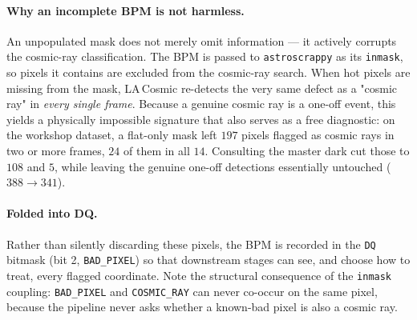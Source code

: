 \documentclass[11pt,a4paper]{article}
\begin{document}
\paragraph{Why an incomplete BPM is not harmless.} An unpopulated mask does not merely omit information --- it actively corrupts the cosmic-ray classification. The BPM is passed to \texttt{astroscrappy} as its \texttt{inmask}, so pixels it contains are excluded from the cosmic-ray search. When hot pixels are missing from the mask, LA\,Cosmic re-detects the very same defect as a "cosmic ray" in \emph{every single frame}. Because a genuine cosmic ray is a one-off event, this yields a physically impossible signature that also serves as a free diagnostic: on the workshop dataset, a flat-only mask left $197$ pixels flagged as cosmic rays in two or more frames, $24$ of them in all $14$. Consulting the master dark cut those to $108$ and $5$, while leaving the genuine one-off detections essentially untouched ($388 \rightarrow 341$).

\paragraph{Folded into DQ.} Rather than silently discarding these pixels, the BPM is recorded in the \texttt{DQ} bitmask (bit 2, \texttt{BAD\_PIXEL}) so that downstream stages can see, and choose how to treat, every flagged coordinate. Note the structural consequence of the \texttt{inmask} coupling: \texttt{BAD\_PIXEL} and \texttt{COSMIC\_RAY} can never co-occur on the same pixel, because the pipeline never asks whether a known-bad pixel is also a cosmic ray.
\end{document}
